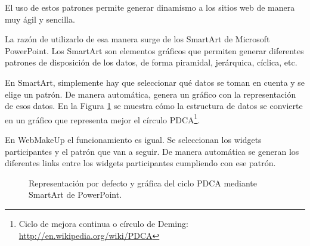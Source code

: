 El uso de estos patrones permite generar dinamismo a los sitios web de manera muy ágil y sencilla.

La razón de utilizarlo de esa manera surge de los SmartArt de Microsoft PowerPoint. Los SmartArt son elementos gráficos que permiten generar diferentes patrones de disposición de los datos, de forma piramidal, jerárquica, cíclica, etc.

En SmartArt, simplemente hay que seleccionar qué datos se toman en cuenta y se elige un patrón. De manera automática, genera un gráfico con la representación de esos datos. En la Figura \ref{fig:SmartArt} se muestra cómo la estructura de datos se convierte en un gráfico que representa mejor el círculo PDCA\footnote{Ciclo de mejora continua o círculo de Deming: \url{http://en.wikipedia.org/wiki/PDCA}}.

En WebMakeUp el funcionamiento es igual. Se seleccionan los widgets participantes y el patrón que van a seguir. De manera automática se generan los diferentes links entre los widgets participantes cumpliendo con ese patrón.

\begin{figure}
\begin{center}
\caption{Representación por defecto y gráfica del ciclo PDCA mediante SmartArt de PowerPoint.}
\label{fig:SmartArt}
\end{center}
\end{figure}

